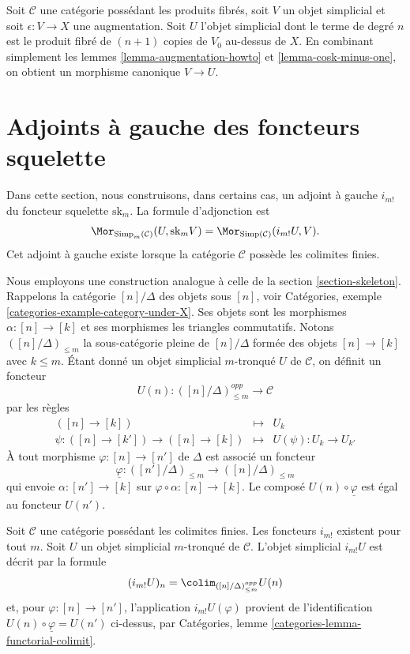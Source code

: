 \begin{remark}
\label{remark-augmentation}
Soit $\mathcal{C}$ une catégorie possédant les produits fibrés, soit $V$
un objet simplicial et soit $\epsilon : V \to X$ une augmentation.
Soit $U$ l'objet simplicial dont le terme de degré $n$ est le produit
fibré de $(n + 1)$ copies de $V_0$ au-dessus de $X$. En combinant simplement
les lemmes \ref{lemma-augmentation-howto} et
\ref{lemma-cosk-minus-one}, on obtient un morphisme canonique $V \to U$.
\end{remark}
\section{Adjoints à gauche des foncteurs squelette}
\label{section-adjoint-left}

\noindent
Dans cette section, nous construisons, dans certains cas, un adjoint à
gauche $i_{m!}$ du foncteur squelette $\text{sk}_m$. La formule
d'adjonction est
$$
\Mor_{\text{Simp}_m(\mathcal{C})}(U, \text{sk}_mV)
=
\Mor_{\text{Simp}(\mathcal{C})}(i_{m!}U, V).
$$
Cet adjoint à gauche existe lorsque la catégorie $\mathcal{C}$ possède
les colimites finies.

\medskip\noindent
Nous employons une construction analogue à celle de la section
\ref{section-skeleton}. Rappelons la catégorie $[n]/\Delta$ des objets
sous $[n]$, voir Catégories, exemple
\ref{categories-example-category-under-X}. Ses objets sont les morphismes
$\alpha : [n] \to [k]$ et ses morphismes les triangles commutatifs.
Notons $([n]/\Delta)_{\leq m}$ la sous-catégorie pleine de
$[n]/\Delta$ formée des objets $[n] \to [k]$ avec $k \leq m$.
Étant donné un objet simplicial $m$-tronqué $U$ de $\mathcal{C}$,
on définit un foncteur
$$
U(n) : ([n]/\Delta)_{\leq m}^{opp} \longrightarrow \mathcal{C}
$$
par les règles
\begin{eqnarray*}
([n] \to [k]) & \longmapsto & U_k \\
\psi : ([n] \to [k']) \to ([n] \to [k])
& \longmapsto &
U(\psi) : U_k \to U_{k'}
\end{eqnarray*}
À tout morphisme $\varphi : [n] \to [n']$ de $\Delta$ est associé un foncteur
$$
\underline{\varphi} :
([n']/\Delta)_{\leq m}
\longrightarrow
([n]/\Delta)_{\leq m}
$$
qui envoie $\alpha : [n'] \to [k]$ sur
$\varphi \circ \alpha : [n] \to [k]$. Le composé
$U(n) \circ \underline{\varphi}$ est égal au foncteur $U(n')$.

\begin{lemma}
\label{lemma-left-adjoint-exists}
Soit $\mathcal{C}$ une catégorie possédant les colimites finies.
Les foncteurs $i_{m!}$ existent pour tout $m$. Soit $U$ un objet
simplicial $m$-tronqué de $\mathcal{C}$. L'objet simplicial $i_{m!}U$
est décrit par la formule
$$
(i_{m!}U)_n = \colim_{([n]/\Delta)_{\leq m}^{opp}} U(n)
$$
et, pour $\varphi : [n] \to [n']$, l'application
$i_{m!}U(\varphi)$ provient de l'identification
$U(n) \circ \underline{\varphi} = U(n')$ ci-dessus, par Catégories,
lemme \ref{categories-lemma-functorial-colimit}.
\end{lemma}


